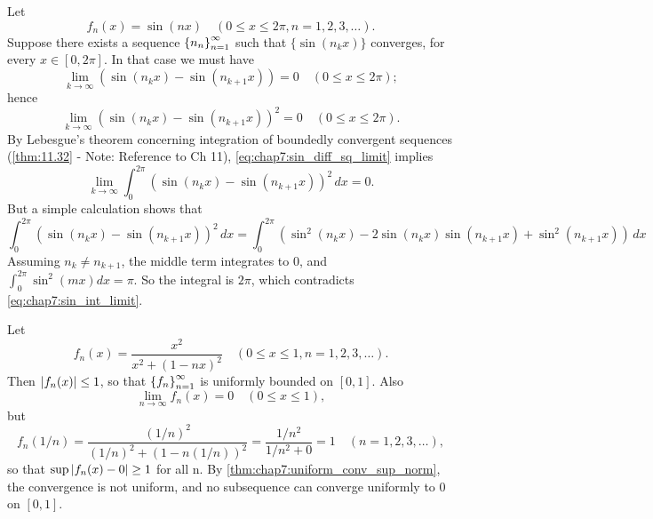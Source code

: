 \begin{example} %
  \label{ex:chap7:sin_nx_no_conv_subseq}
  Let
  \[ f_n(x) = \sin(nx) \quad (0 \le x \le 2\pi, n=1, 2, 3, \dots). \]
  Suppose there exists a sequence $\left\{ n_n \right\}_{n=1}^\infty$ such that
  $\{\sin(n_k x)\}$ converges, for every $x \in [0, 2\pi]$. In that
  case we must have
  \[ \lim_{k \to \infty} (\sin(n_k x) - \sin(n_{k+1} x)) = 0 \quad (0
  \le x \le 2\pi); \]
  hence
  \begin{equation} \label{eq:chap7:sin_diff_sq_limit}
    \lim_{k \to \infty} (\sin(n_k x) - \sin(n_{k+1} x))^2 = 0 \quad
    (0 \le x \le 2\pi).
  \end{equation}
  By Lebesgue's theorem concerning integration of boundedly
  convergent sequences (\autoref{thm:11.32} - Note: Reference to Ch
  11), \eqref{eq:chap7:sin_diff_sq_limit} implies
  \begin{equation} \label{eq:chap7:sin_int_limit}
    \lim_{k \to \infty} \int_0^{2\pi} (\sin(n_k x) - \sin(n_{k+1}
    x))^2 \, dx = 0.
  \end{equation}
  But a simple calculation shows that
  \[ \int_0^{2\pi} (\sin(n_k x) - \sin(n_{k+1} x))^2 \, dx =
    \int_0^{2\pi} (\sin^2(n_k x) - 2\sin(n_k x)\sin(n_{k+1} x) +
  \sin^2(n_{k+1} x)) \, dx \]
  Assuming $n_k \ne n_{k+1}$, the middle term integrates to 0, and
  $\int_0^{2\pi} \sin^2(mx) dx = \pi$. So the integral is $2\pi$,
  which contradicts \eqref{eq:chap7:sin_int_limit}.
\end{example}


\begin{example} %
  \label{ex:chap7:pointwise_not_uniform_conv}
  Let
  \[ f_n(x) = \frac{x^2}{x^2 + (1 - nx)^2} \quad (0 \le x \le 1, n=1,
  2, 3, \dots). \]
  Then $\left\lvert f_n(x) \right\rvert \le 1$, so that $\left\{ f_n \right\}_{n=1}^\infty$ is uniformly
  bounded on $[0, 1]$. Also
  \[ \lim_{n \to \infty} f_n(x) = 0 \quad (0 \le x \le 1), \]
  but
  \[ f_n(1/n) = \frac{(1/n)^2}{(1/n)^2 + (1 - n(1/n))^2} =
  \frac{1/n^2}{1/n^2 + 0} = 1 \quad (n=1, 2, 3, \dots), \]
  so that $\sup \left\lvert f_n(x) - 0 \right\rvert \ge 1$ for all n. By
  \autoref{thm:chap7:uniform_conv_sup_norm}, the convergence is not
  uniform, and no subsequence can converge uniformly to 0 on $[0, 1]$.
\end{example}

